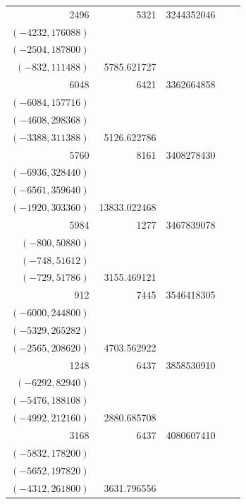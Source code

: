 \documentclass[11pt]{article}
\begin{document}
\begin{longtable}{r r r l r}
2496 & 5321 & 3244352046 & \begin{tabular}[t]{@{}l@{}}$(-5304,26520)$\\$(-4232,176088)$\\$(-2504,187800)$\\$(-832,111488)$\end{tabular} & 5785.621727\\[5pt]
6048 & 6421 & 3362664858 & \begin{tabular}[t]{@{}l@{}}$(-6300,97020)$\\$(-6084,157716)$\\$(-4608,298368)$\\$(-3388,311388)$\end{tabular} & 5126.622786\\[5pt]
5760 & 8161 & 3408278430 & \begin{tabular}[t]{@{}l@{}}$(-8112,74256)$\\$(-6936,328440)$\\$(-6561,359640)$\\$(-1920,303360)$\end{tabular} & 13833.022468\\[5pt]
5984 & 1277 & 3467839078 & \begin{tabular}[t]{@{}l@{}}$(-1224,21624)$\\$(-800,50880)$\\$(-748,51612)$\\$(-729,51786)$\end{tabular} & 3155.469121\\[5pt]
912 & 7445 & 3546418305 & \begin{tabular}[t]{@{}l@{}}$(-6897,171798)$\\$(-6000,244800)$\\$(-5329,265282)$\\$(-2565,208620)$\end{tabular} & 4703.562922\\[5pt]
1248 & 6437 & 3858530910 & \begin{tabular}[t]{@{}l@{}}$(-6396,44772)$\\$(-6292,82940)$\\$(-5476,188108)$\\$(-4992,212160)$\end{tabular} & 2880.685708\\[5pt]
3168 & 6437 & 4080607410 & \begin{tabular}[t]{@{}l@{}}$(-6241,107282)$\\$(-5832,178200)$\\$(-5652,197820)$\\$(-4312,261800)$\end{tabular} & 3631.796556\\[5pt]

\end{longtable}
\end{document}
